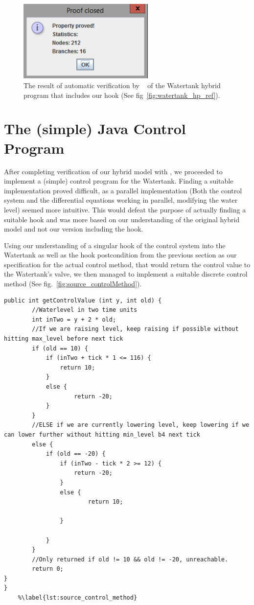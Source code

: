 \begin{figure}
	\centering
	\includegraphics[width=0.6\textwidth]{images/watertank_keym_ver}
	\caption{The result of automatic verification by \keym~ of the Watertank hybrid program that includes our hook (See fig~\ref{fig:watertank_hp_ref}).}
	\label{fig:KeymaeraVerWatertank}
\end{figure}

\section{The (simple) Java Control Program}
\label{sec:Watertank:Java}

After completing verification of our hybrid model with \keym, we proceeded to implement a (simple) control program for the Watertank. Finding a suitable implementation proved difficult, as a parallel implementation (Both the control system and the differential equations working in parallel, modifying the water level) seemed more intuitive. This would defeat the purpose of actually finding a suitable hook and was more based on our understanding of the original hybrid model and not our version including the hook.

Using our understanding of a singular hook of the control system into the Watertank as well as the hook postcondition from the previous section as our specification for the actual control method, that would return the control value to the Watertank's valve, we then managed to implement a suitable discrete control method (See fig.~\ref{fig:source_controlMethod}).

\lstset{language=Java}
\begin{lstlisting}
public int getControlValue (int y, int old) {
		//Waterlevel in two time units
		int inTwo = y + 2 * old;
		//If we are raising level, keep raising if possible without hitting max_level before next tick
		if (old == 10) {
			if (inTwo + tick * 1 <= 116) {
				return 10;
			}
			else {
					return -20;
			}
		}
		//ELSE if we are currently lowering level, keep lowering if we can lower further without hitting min_level b4 next tick
		else {
			if (old == -20) {
				if (inTwo - tick * 2 >= 12) {
					return -20;
				}
				else {
						return 10;
				
				}
		
			}
		}
		//Only returned if old != 10 && old != -20, unreachable.
		return 0;
}
}
	%\label{lst:source_control_method}
\end{lstlisting}

